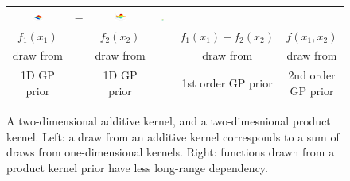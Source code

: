\begin{figure}
\begin{tabular}{ccccc|c}
\includegraphics[width=0.2\textwidth]{../figures/additive_multi_d/additive_kernel_draw_sum_p2.pdf}& \hspace{-0.4cm} = \hspace{-0.4cm}&
\includegraphics[width=0.2\textwidth]{../figures/additive_multi_d/additive_kernel_draw_sum.pdf} &
\includegraphics[width=0.2\textwidth]{../figures/additive_multi_d/sqexp_draw.pdf} \\
$f_1(x_1)$ & & $f_2(x_2)$ & & $f_1(x_1) + f_2(x_2)$ & $f(x_1, x_2)$ \\
draw from & & draw from & & draw from & draw from\\
1D GP prior & & 1D GP prior & & 1st order GP prior & 2nd order GP prior\\
\end{tabular}
\caption{A two-dimensional additive kernel, and a two-dimesnional product kernel.  Left: a draw from an additive kernel corresponds to a sum of draws from one-dimensional kernels.  Right: functions drawn from a product kernel prior have less long-range dependency.
}
\label{fig:multi_d_additivity}
\end{figure}